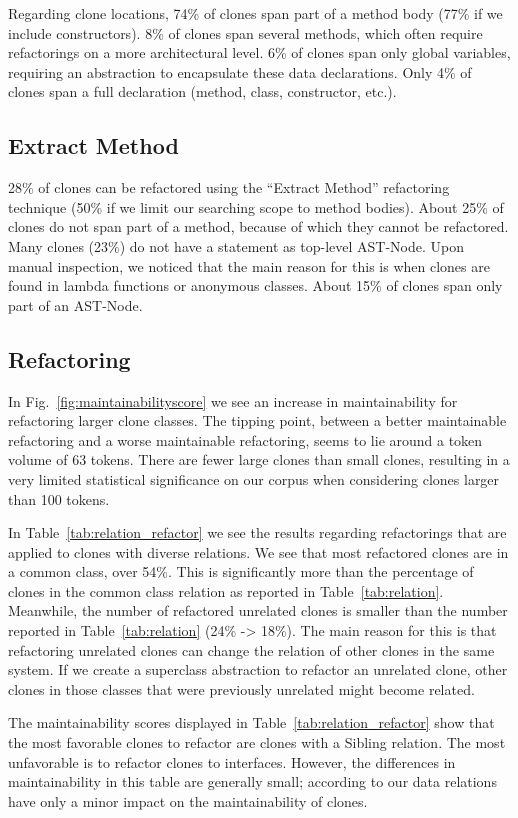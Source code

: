 \documentclass[conference]{IEEEtran}
\begin{document}
Regarding clone locations, 74\% of clones span part of a method body (77\% if we include constructors). 8\% of clones span several methods, which often require refactorings on a more architectural level. 6\% of clones span only global variables, requiring an abstraction to encapsulate these data declarations. Only 4\% of clones span a full declaration (method, class, constructor, etc.).

\subsection{Extract Method}
28\% of clones can be refactored using the ``Extract Method'' refactoring technique (50\% if we limit our searching scope to method bodies). About 25\% of clones do not span part of a method, because of which they cannot be refactored. Many clones (23\%) do not have a statement as top-level AST-Node. Upon manual inspection, we noticed that the main reason for this is when clones are found in lambda functions or anonymous classes. About 15\% of clones span only part of an AST-Node.

\subsection{Refactoring}
In Fig.~\ref{fig:maintainabilityscore} we see an increase in maintainability for refactoring larger clone classes. The tipping point, between a better maintainable refactoring and a worse maintainable refactoring, seems to lie around a token volume of 63 tokens. There are fewer large clones than small clones, resulting in a very limited statistical significance on our corpus when considering clones larger than 100 tokens.

In Table~\ref{tab:relation_refactor} we see the results regarding refactorings that are applied to clones with diverse relations. We see that most refactored clones are in a common class, over 54\%. This is significantly more than the percentage of clones in the common class relation as reported in Table~\ref{tab:relation}. Meanwhile, the number of refactored unrelated clones is smaller than the number reported in Table~\ref{tab:relation} (24\% -> 18\%). The main reason for this is that refactoring unrelated clones can change the relation of other clones in the same system. If we create a superclass abstraction to refactor an unrelated clone, other clones in those classes that were previously unrelated might become related.

The maintainability scores displayed in Table~\ref{tab:relation_refactor} show that the most favorable clones to refactor are clones with a Sibling relation. The most unfavorable is to refactor clones to interfaces. However, the differences in maintainability in this table are generally small; according to our data relations have only a minor impact on the maintainability of clones.
\end{document}

